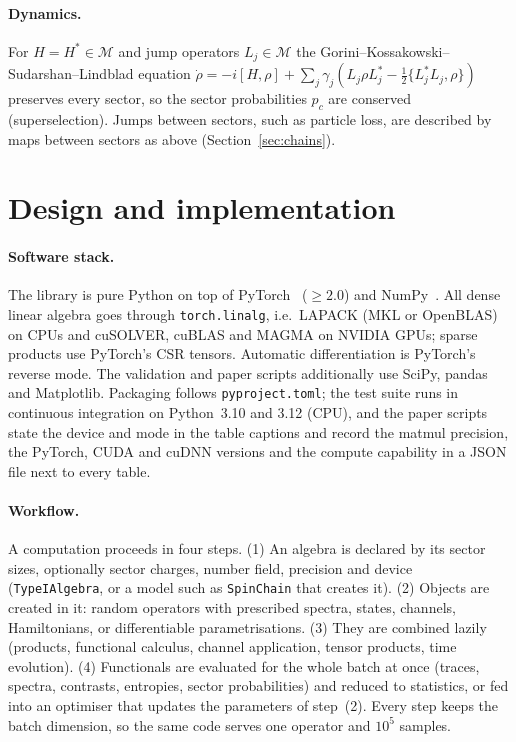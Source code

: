 \documentclass[11pt]{article}
\newcommand{\M}{\mathcal{M}}
\begin{document}
\paragraph{Dynamics.} For $H=H^*\in\M$ and jump operators $L_j\in\M$ the
Gorini--Kossakowski--Sudarshan--Lindblad equation
$\dot\rho=-i[H,\rho]+\sum_j\gamma_j(L_j\rho L_j^*-\tfrac12\{L_j^*L_j,\rho\})$ preserves every sector,
so the sector probabilities $p_c$ are conserved (superselection). Jumps between sectors, such as particle loss,
are described by maps between sectors as above (Section~\ref{sec:chains}).

\section{Design and implementation}\label{sec:design}

\paragraph{Software stack.} The library is pure Python on top of PyTorch~\cite{paszke2019} ($\ge2.0$) and NumPy~\cite{harris2020}. All dense linear algebra goes through \texttt{torch.linalg}, i.e.\ LAPACK
(MKL or OpenBLAS) on CPUs and cuSOLVER, cuBLAS and MAGMA on NVIDIA GPUs; sparse products use PyTorch's CSR
tensors. Automatic differentiation is PyTorch's reverse mode. The validation and paper scripts additionally use
SciPy, pandas and Matplotlib. Packaging follows \texttt{pyproject.toml}; the test suite runs in continuous
integration on Python~3.10 and 3.12 (CPU), and the paper scripts state the device and mode in the table captions and record the matmul precision, the
PyTorch, CUDA and cuDNN versions and the compute capability in a JSON file next to every table.

\paragraph{Workflow.} A computation proceeds in four steps. (1) An algebra is declared by its sector sizes,
optionally sector charges, number field, precision and device (\texttt{TypeIAlgebra}, or a model such as
\texttt{SpinChain} that creates it). (2) Objects are created in it: random operators with prescribed spectra,
states, channels, Hamiltonians, or differentiable parametrisations. (3) They are combined lazily (products,
functional calculus, channel application, tensor products, time evolution). (4) Functionals are evaluated for the
whole batch at once (traces, spectra, contrasts, entropies, sector probabilities) and reduced to statistics, or
fed into an optimiser that updates the parameters of step~(2). Every step keeps the batch dimension, so the same
code serves one operator and $10^5$ samples.
\end{document}
